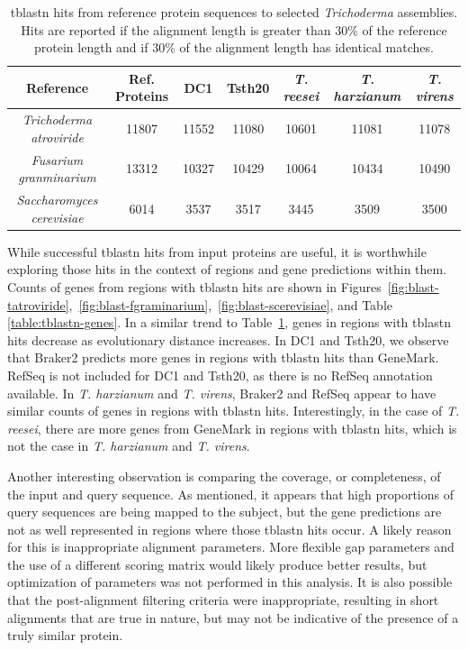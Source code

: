 \begin{table}
  \centering
  \begin{tabular}{|c|c|c|c|c|c|c|}
    \hline
    Reference & Ref. Proteins & DC1 & Tsth20 & \textit{T. reesei} & \textit{T. harzianum} & \textit{T. virens}  \\ \hline
    \textit{Trichoderma atroviride} & 11807 & 11552 & 11080 & 10601 & 11081 & 11078 \\ \hline 
    \textit{Fusarium granminarium} & 13312 & 10327 & 10429 & 10064 & 10434 & 10490 \\ \hline
    \textit{Saccharomyces cerevisiae} & 6014 & 3537 & 3517 & 3445 & 3509 & 3500 \\ \hline
  \end{tabular}
  \caption{tblastn hits from reference protein sequences to selected
    \textit{Trichoderma} assemblies. Hits are reported if the
    alignment length is greater than 30\% of the reference protein
    length and if 30\% of the alignment length has identical
    matches.}
  \label{table:tblastn-prots}
\end{table}

While successful tblastn hits from input proteins are useful, it is
worthwhile exploring those hits in the context of regions and gene
predictions within them. Counts of genes from regions with tblastn
hits are shown in Figures~\ref{fig:blast-tatroviride},~\ref{fig:blast-fgraminarium},~\ref{fig:blast-scerevisiae}, and Table \ref{table:tblastn-genes}. In a similar trend
to Table~\ref{table:tblastn-prots}, genes in regions with tblastn hits
decrease as evolutionary distance increases. In DC1 and Tsth20, we
observe that Braker2 predicts more genes in regions with tblastn hits
than GeneMark. RefSeq is not included for DC1 and Tsth20, as there is
no RefSeq annotation available. In \textit{T. harzianum} and
\textit{T. virens}, Braker2 and RefSeq appear to have similar counts
of genes in regions with tblastn hits. Interestingly, in the case of
\textit{T. reesei}, there are more genes from GeneMark in regions with
tblastn hits, which is not the case in \textit{T. harzianum} and
\textit{T. virens}.

Another interesting observation is comparing the coverage, or
completeness, of the input and query sequence. As mentioned, it
appears that high proportions of query sequences are being mapped to
the subject, but the gene predictions are not as well represented in
regions where those tblastn hits occur. A likely reason for this is
inappropriate alignment parameters. More flexible gap parameters and
the use of a different scoring matrix would likely produce better
results, but optimization of parameters was not performed in this
analysis. It is also possible that the post-alignment filtering
criteria were inappropriate, resulting in short alignments that are
true in nature, but may not be indicative of the presence of a truly
similar protein.

